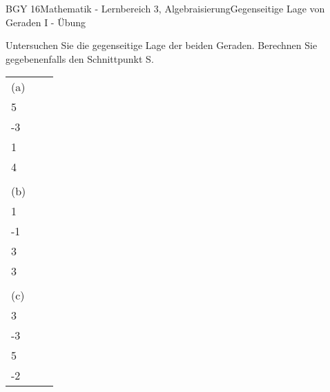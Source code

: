 \documentclass[oneside,openany,headings=optiontotoc,11pt,numbers=noenddot]{scrreprt}
\begin{document}
	\begin{worksheet}{BGY 16}{Mathematik - Lernbereich 3, Algebraisierung}{Gegenseitige Lage von Geraden I - Übung}
				
		\begin{framed}
			\noindent
			Untersuchen Sie die gegenseitige Lage der beiden Geraden. Berechnen Sie gegebenenfalls den Schnittpunkt S.\\
			\begin{tabularx}{\textwidth}{lXX}
				(a) & \(g: \vec{x} = \left(\begin{array}{c}2\\5\end{array}\right) + r\left(\begin{array}{c}-5\\-3\end{array}\right)\) &	\(h: \vec{x} = \left(\begin{array}{c}5\\1\end{array}\right) + t\left(\begin{array}{c}1\\4\end{array}\right)\)\\
				&&\\
				(b) & \(g: \vec{x} = \left(\begin{array}{c}-4\\1\end{array}\right) + r\left(\begin{array}{c}-2\\-1\end{array}\right)\) &	\(h: \vec{x} = \left(\begin{array}{c}0\\3\end{array}\right) + t\left(\begin{array}{c}6\\3\end{array}\right)\)\\
				&&\\
				(c) & \(g: \vec{x} = \left(\begin{array}{c}1\\3\end{array}\right) + r\left(\begin{array}{c}9\\-3\end{array}\right)\) &	\(h: \vec{x} = \left(\begin{array}{c}4\\5\end{array}\right) + t\left(\begin{array}{c}-4\\-2\end{array}\right)\)\\

\end{tabularx}
\end{framed}
\end{worksheet}
\end{document}

